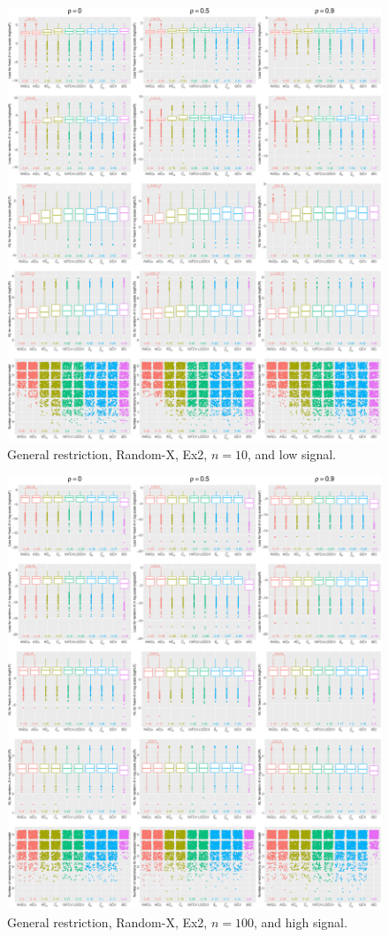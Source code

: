 \begin{figure}[!ht]
\centering
\includegraphics[width=\textwidth]{figures/supplement/randomx/general_restriction/Ex2_n10_lsnr.eps}
\caption{General restriction, Random-X, Ex2, $n=10$, and low signal.}
\end{figure}
\clearpage
\begin{figure}[!ht]
\centering
\includegraphics[width=\textwidth]{figures/supplement/randomx/general_restriction/Ex2_n100_hsnr.eps}
\caption{General restriction, Random-X, Ex2, $n=100$, and high signal.}
\end{figure}
